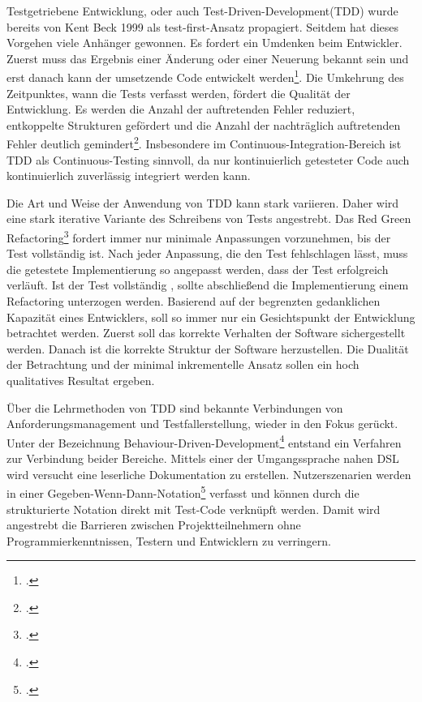 Testgetriebene Entwicklung, oder auch Test-Driven-Development(TDD) wurde bereits von Kent Beck 1999 als \glqq test-first\grqq{}-Ansatz propagiert. Seitdem hat dieses Vorgehen viele Anhänger gewonnen. Es fordert ein Umdenken beim Entwickler. Zuerst muss das Ergebnis einer Änderung oder einer Neuerung bekannt sein und erst danach kann der umsetzende Code entwickelt werden\footcite[vgl.][Kap. Understanding TDD]{tdd-java}. Die Umkehrung des Zeitpunktes, wann die Tests verfasst werden, fördert die Qualität der Entwicklung. Es werden die Anzahl der auftretenden Fehler reduziert, entkoppelte Strukturen gefördert und die Anzahl der nachträglich auftretenden Fehler deutlich gemindert\footcite[vgl.][]{tdd-ci-effectivness}.
Insbesondere im Continuous-Integration-Bereich ist TDD als Continuous-Testing sinnvoll, da nur kontinuierlich getesteter Code auch kontinuierlich zuverlässig integriert werden kann.

Die Art und Weise der Anwendung von TDD kann stark variieren. Daher wird eine stark iterative Variante des Schreibens von Tests angestrebt. Das \glqq Red Green Refactoring\grqq{}\footcite[vgl.][Kap. Red-Green-Refactor]{tdd-java} fordert immer nur minimale Anpassungen vorzunehmen, bis der Test vollständig ist. Nach jeder Anpassung, die den Test fehlschlagen lässt, muss die getestete Implementierung so angepasst werden, dass der Test erfolgreich verläuft. Ist der Test vollständig , sollte abschließend die Implementierung einem Refactoring unterzogen werden. Basierend auf der begrenzten gedanklichen Kapazität eines Entwicklers, soll so immer nur ein Gesichtspunkt der Entwicklung betrachtet werden. Zuerst soll das korrekte Verhalten der Software sichergestellt werden. Danach ist die korrekte Struktur der Software herzustellen. Die Dualität der Betrachtung und der minimal inkrementelle Ansatz sollen ein hoch qualitatives Resultat ergeben.

Über die Lehrmethoden von TDD sind bekannte Verbindungen von Anforderungsmanagement und Testfallerstellung, wieder in den Fokus gerückt. Unter der Bezeichnung \glqq Behaviour-Driven-Development\grqq{}\footcite{bdd-north} entstand ein Verfahren zur Verbindung beider Bereiche. Mittels einer der Umgangssprache nahen DSL wird versucht eine leserliche Dokumentation zu erstellen. Nutzerszenarien werden in einer Gegeben-Wenn-Dann-Notation\footcite{fowler-gwt} verfasst und können durch die strukturierte Notation direkt mit Test-Code verknüpft werden. Damit wird angestrebt die Barrieren zwischen Projektteilnehmern ohne Programmierkenntnissen, Testern und Entwicklern zu verringern.

